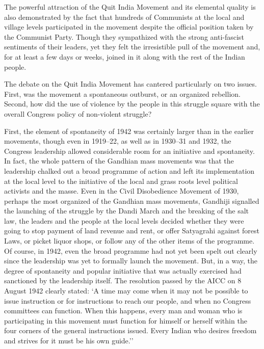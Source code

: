 The powerful attraction of the Quit India Movement and its elemental quality is also demonstrated by the fact that hundreds of Communists at the local and village levels participated in the movement despite the official position taken by the Communist Party. Though they sympathized with the strong anti-fascist sentiments of their leaders, yet they felt the irresistible pull of the movement and, for at least a few days or weeks, joined in it along with the rest of the Indian people.

The debate on the Quit India Movement has cantered particularly on two issues. First, was the movement a spontaneous outburst, or an organized rebellion. Second, how did the use of violence by the people in this struggle square with the overall Congress policy of non-violent struggle?

First, the element of spontaneity of 1942 was certainly larger than in the earlier movements, though even in 1919--22, as well as in 1930--31 and 1932, the Congress leadership allowed considerable room for an initiative and spontaneity. In fact, the whole pattern of the Gandhian mass movements was that the leadership chalked out a broad programme of action and left its implementation at the local level to the initiative of the local and grass roots level political activists and the masse. Even in the Civil Disobedience Movement of 1930, perhaps the most organized of the Gandhian mass movements, Gandhiji signalled the launching of the struggle by the Dandi March and the breaking of the salt law, the leaders and the people at the local levels decided whether they were going to stop payment of land revenue and rent, or offer Satyagrahi against forest Laws, or picket liquor shops, or follow any of the other items of the programme. Of course, in 1942, even the broad programme had not yet been spelt out clearly since the leadership was yet to formally launch the movement. But, in a way, the degree of spontaneity and popular initiative that was actually exercised had sanctioned by the leadership itself. The resolution passed by the AICC on 8 August 1942 clearly stated: `A time may come when it may not be possible to issue instruction or for instructions to reach our people, and when no Congress committees can function. When this happens, every man and woman who is participating in this movement must function for himself or herself within the four corners of the general instructions issued. Every Indian who desires freedom and strives for it must be his own guide.''

